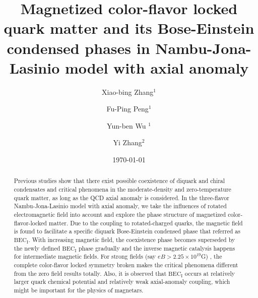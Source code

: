 \documentclass[prd, showpacs,nofootinbib,amsmath,amssymb,12pt]{revtex4}
\begin{document}
\title{Magnetized color-flavor locked quark matter and its Bose-Einstein condensed phases in Nambu-Jona-Lasinio model with axial anomaly }
\author{Xiao-bing Zhang$^1$}
\author{Fu-Ping Peng$^1$}
\author{Yun-ben Wu $^1$}
\author{Yi Zhang$^2$}


\date{\today}
\begin{abstract}
Previous studies show that there exist possible coexistence of diquark and chiral condensates and  critical phenomena in the moderate-density and zero-temperature quark matter,
as long as the QCD axial anomaly is considered.
In the three-flavor Nambu-Jona-Lasinio model with axial anomaly,
we take the influences of rotated electromagnetic field into account and explore the phase structure of  magnetized color-flavor-locked  matter.
Due to the coupling to rotated-charged quarks, the magnetic field is found to facilitate a specific diquark Bose-Einstein condensed phase that referred as $\text{BEC}_\text{I}$.
 With increasing magnetic field, the coexistence phase becomes superseded  by the newly defined $\text{BEC}_\text{I}$ phase gradually 
 and the inverse magnetic catalysis happens for intermediate magnetic fields. For strong fields (say $eB>2.25\times10^{19}$G) , 
 the complete color-flavor locked symmetry broken
  makes the critical phenomena different from the zero field results   totally.
Also, it is observed that   $\text{BEC}_\text{I}$   occurs at relatively larger quark chemical potential and  relatively weak axial-anomaly coupling, which might be important for  the physics of magnetars.

\end{abstract}
\maketitle
\end{document}
